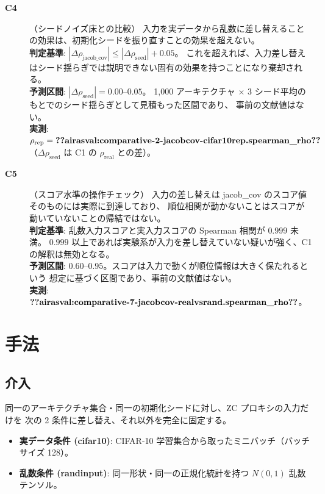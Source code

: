 \documentclass[11pt]{article}
\providecommand{\airasval}[1]{\textbf{??airasval:\detokenize{#1}??}}
\begin{document}
\begin{description}
\item[\textbf{C4}]（シードノイズ床との比較）
入力を実データから乱数に差し替えることの効果は、初期化シードを振り直すことの効果を超えない。\\
\textbf{判定基準}: $|\Delta\rho_{\mathrm{jacob\_cov}}| \le |\Delta\rho_{\mathrm{seed}}| + 0.05$。
これを超えれば、入力差し替えはシード揺らぎでは説明できない固有の効果を持つことになり棄却される。\\
\textbf{予測区間}: $|\Delta\rho_{\mathrm{seed}}| = 0.00$--$0.05$。
1{,}000 アーキテクチャ $\times$ 3 シード平均のもとでのシード揺らぎとして見積もった区間であり、
事前の文献値はない。\\
\textbf{実測}: $\rho_{\mathrm{rep}} = \airasval{comparative-2-jacobcov-cifar10rep.spearman_rho}$
（$\Delta\rho_{\mathrm{seed}}$ は C1 の $\rho_{\mathrm{real}}$ との差）。

\item[\textbf{C5}]（スコア水準の操作チェック）
入力の差し替えは jacob\_cov のスコア値そのものには実際に到達しており、
順位相関が動かないことはスコアが動いていないことの帰結ではない。\\
\textbf{判定基準}: 乱数入力スコアと実入力スコアの Spearman 相関が $0.999$ 未満。
$0.999$ 以上であれば実験系が入力を差し替えていない疑いが強く、C1 の解釈は無効となる。\\
\textbf{予測区間}: $0.60$--$0.95$。スコアは入力で動くが順位情報は大きく保たれるという
想定に基づく区間であり、事前の文献値はない。\\
\textbf{実測}: $\airasval{comparative-7-jacobcov-realvsrand.spearman_rho}$。

\end{description}

\section{手法}

\subsection{介入}

同一のアーキテクチャ集合・同一の初期化シードに対し、ZC プロキシの入力だけを
次の 2 条件に差し替え、それ以外を完全に固定する。

\begin{itemize}
\item \textbf{実データ条件 (cifar10)}: CIFAR-10 学習集合から取ったミニバッチ（バッチサイズ 128）。
\item \textbf{乱数条件 (randinput)}: 同一形状・同一の正規化統計を持つ $N(0,1)$ 乱数テンソル。
\end{itemize}
\end{document}
